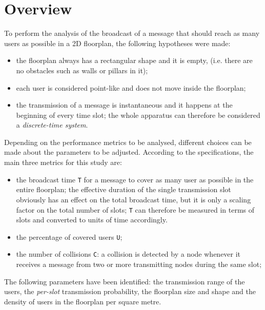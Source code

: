 %
\chapter{Overview}\label{ch:overview}
To perform the analysis of the broadcast of a message that should reach as many
users as possible in a 2D floorplan, the following hypotheses were made:
\begin{itemize}
	\item the floorplan always has a rectangular shape and it is empty, (i.e.
	there are no obstacles such as walls or pillars in it);
	\item each user is considered point-like and does not move inside the
	floorplan;
	\item the transmission of a message is instantaneous and it happens at the
	beginning of every time slot; the whole apparatus can therefore be
	considered a \textit{discrete-time system}.
\end{itemize}
Depending on the performance metrics to be analysed, different choices can be
made about the parameters to be adjusted. According to the specifications, the
main three metrics for this study are:
\begin{itemize}
	\item the broadcast time \colorbox{gray!30}{\large \texttt{T}} for a message
	to cover as many user as possible in the entire floorplan; the effective
	duration of the single transmission slot obviously has an effect
	on the total broadcast time, but it is only a scaling factor on the total
	number of slots; \texttt{T} can therefore be measured in terms of slots and
	converted to units of time accordingly.
	\item the percentage of covered users \colorbox{gray!30}{\large \texttt{U}};
	\item the number of collisions \colorbox{gray!30}{\large \texttt{C}}:
	a collision is detected by a node whenever it receives a message from two or more transmitting nodes during the same slot;
\end{itemize}
The following parameters have been identified: the transmission range of the
users, the \textit{per-slot} transmission probability, the floorplan size and shape and the density of users in the floorplan per square metre.\\
